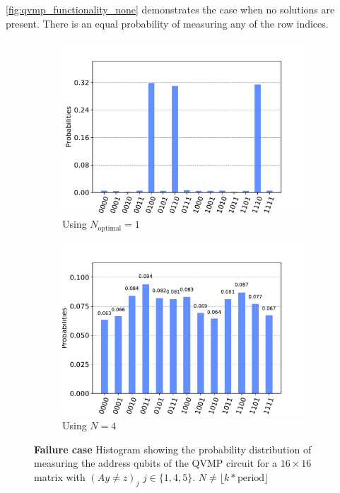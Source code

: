 \documentclass[11pt]{article}
\theoremstyle{definition}
\theoremstyle{remark}
\begin{document}
\cref{fig:qvmp_functionality_none} demonstrates the case when no solutions are
present. There is an equal probability of measuring any of the row indices.

\begin{figure}[h!]
  \centering
  \begin{subfigure}{0.48\textwidth}
    \centering
    \includegraphics[width=\textwidth]{../../results/figures/qvmp_functionality_pfound_known__1.pdf}
    \caption{Using $N_{\text{optimal}} = 1$}
  \end{subfigure}
  \begin{subfigure}{0.48\textwidth}
    \centering
    \includegraphics[width=\textwidth]{../../results/figures/qvmp_functionality_pfound_unknown__1.pdf}
    \caption{Using $N = 4$}
  \end{subfigure}
  \caption{\textbf{Failure case} Histogram showing the probability distribution
  of measuring the address qubits of the QVMP circuit for a $16 \times 16$
  matrix with $(Ay \neq z)_j$ $j \in \{1, 4, 5\}$. $N \neq \lfloor
  k*\text{period} \rfloor$}
  \label{fig:qvmp_functionality_pfound_unknown__1}
\end{figure}
\end{document}
